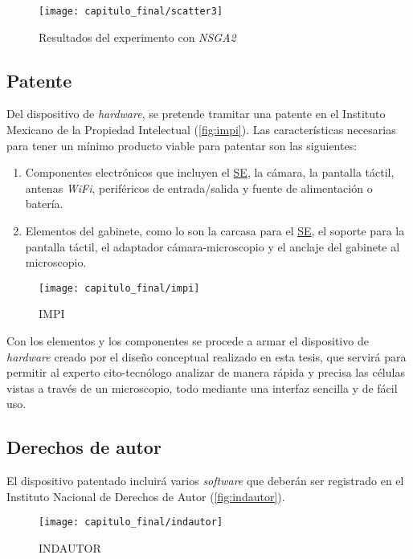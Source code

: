 \begin{figure}[H]
    \centering
    \texttt{[image: capitulo\_final/scatter3]}
    \caption{Resultados del experimento con \emph{NSGA2}}\label{fig:resultnsga}
\end{figure}

\subsection{Patente}

Del dispositivo de \emph{hardware}, se pretende tramitar una patente en el
Instituto Mexicano de la Propiedad Intelectual (\autoref{fig:impi}). Las
características necesarias para tener un mínimo producto viable para patentar
son las siguientes:

\begin{enumerate}
    \item Componentes electrónicos que incluyen el \hyperlink{abbr}{SE}, la
    cámara, la pantalla táctil, antenas \emph{WiFi}, periféricos de
    entrada/salida y fuente de alimentación o batería.
    \item Elementos del gabinete, como lo son la carcasa para el
    \hyperlink{abbr}{SE}, el soporte para la pantalla táctil, el adaptador
    cámara-microscopio y el anclaje del gabinete al microscopio.
\end{enumerate}

\begin{figure}[H]
    \centering
    \texttt{[image: capitulo\_final/impi]}
    \caption{IMPI}\label{fig:impi}
\end{figure}

Con los elementos y los componentes se procede a armar el dispositivo de
\emph{hardware} creado por el diseño conceptual realizado en esta tesis, que
servirá para permitir al experto cito-tecnólogo analizar de manera rápida y
precisa las células vistas a través de un microscopio, todo mediante una
interfaz sencilla y de fácil uso.

\subsection{Derechos de autor}

El dispositivo patentado incluirá varios \emph{software} que deberán ser
registrado en el Instituto Nacional de Derechos de Autor
(\autoref{fig:indautor}).

\begin{figure}[H]
    \centering
    \texttt{[image: capitulo\_final/indautor]}
    \caption{INDAUTOR}\label{fig:indautor}
\end{figure}

